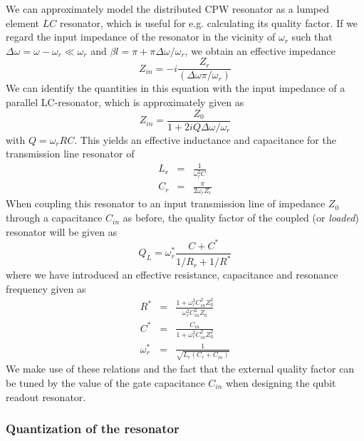 We can approximately model the distributed CPW resonator as a lumped element $LC$ resonator, which is useful for e.g. calculating its quality factor. If we regard the input impedance of the resonator in the vicinity of $\omega_r$ such that $\Delta \omega = \omega -\omega_r \ll \omega_r$ and $\beta l = \pi +\pi\Delta \omega /\omega_r$, we obtain an effective impedance
%
\begin{equation}
Z_{in} = -i\frac{Z_{r}}{(\Delta \omega \pi / \omega_r)}
\end{equation}
%
We can identify the quantities in this equation with the input impedance of a parallel LC-resonator, which is approximately given as
%
\begin{equation}
Z_{in} = \frac{Z_0}{1+2i Q \Delta \omega / \omega_r}
\end{equation}
%
with $Q=\omega_r RC$. This yields an effective inductance and capacitance for the transmission line resonator of
%
\begin{eqnarray}
L_{r} & = & \frac{1}{\omega_r^2 C} \\
C_{r} & = & \frac{\pi}{2\omega_r Z_r}
\end{eqnarray}
%
When coupling this resonator to an input transmission line of impedance $Z_0$ through a  capacitance $C_{in}$ as before, the quality factor of the coupled (or {\it loaded}) resonator will be given as
%
\begin{equation}
Q_L = \omega_r^* \frac{C+C^*}{1/R_{r}+1/R^*}
\end{equation}
%
where we have introduced an effective resistance, capacitance and resonance frequency given as
%
\begin{eqnarray}
R^* & = & \frac{1+\omega_r^2 C_{in}^2 Z_0^2}{\omega_r^2 C_{in}^2 Z_0} \\
C^* & = & \frac{C_{in}}{1+\omega_r^2 C_{in}^2 Z_0^2} \\
\omega_r^* & = & \frac{1}{\sqrt{L_r(C_r+C_{in})}}
\end{eqnarray}
%
We make use of these relations and the fact that the external quality factor can be tuned by the value of the gate capacitance $C_{in}$ when designing the qubit readout resonator. 

\subsubsection{Quantization of the resonator}

